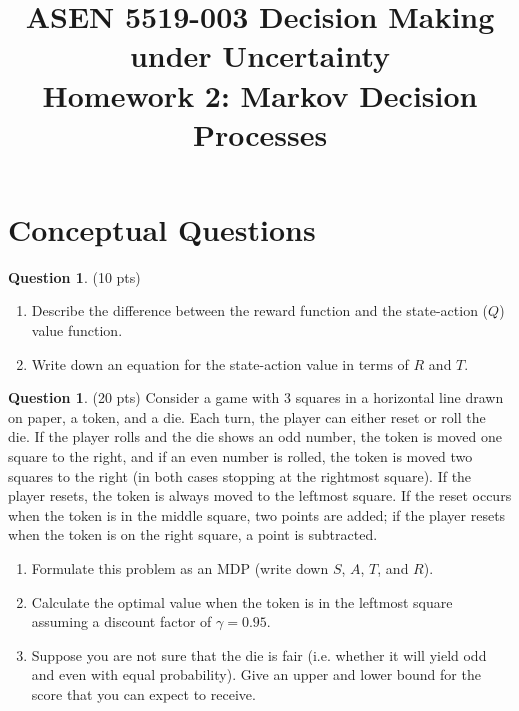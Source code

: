 \documentclass{article}
\title{ASEN 5519-003 Decision Making under Uncertainty\\
       Homework 2: Markov Decision Processes}
\theoremstyle{definition}
\newtheorem{question}[thm]{Question}
\begin{document}
\maketitle

\section{Conceptual Questions}

\begin{question} (10 pts)
    \begin{enumerate}[label=\alph*)]
        \item Describe the difference between the reward function and the state-action ($Q$) value function.
        \item Write down an equation for the state-action value in terms of $R$ and $T$.
    \end{enumerate}
\end{question}

\begin{question} (20 pts)
    Consider a game with 3 squares in a horizontal line drawn on paper, a token, and a die. Each turn, the player can either reset or roll the die. If the player rolls and the die shows an odd number, the token is moved one square to the right, and if an even number is rolled, the token is moved two squares to the right (in both cases stopping at the rightmost square). If the player resets, the token is always moved to the leftmost square. If the reset occurs when the token is in the middle square, two points are added; if the player resets when the token is on the right square, a point is subtracted.
    \begin{enumerate}[label=\alph*)]
        \item Formulate this problem as an MDP (write down $S$, $A$, $T$, and $R$).
        \item Calculate the optimal value when the token is in the leftmost square assuming a discount factor of $\gamma = 0.95$.
        \item Suppose you are not sure that the die is fair (i.e. whether it will yield odd and even with equal probability). Give an upper and lower bound for the score that you can expect to receive.
    \end{enumerate}
\end{question}
\end{document}
